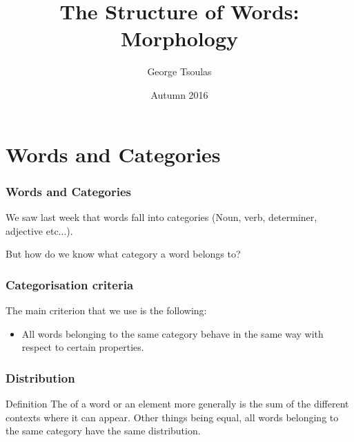


\title{The Structure of Words:  Morphology }
\date{Autumn 2016}
\author{George Tsoulas}


\maketitle
\section{Words and Categories}
\begin{frame}
  \frametitle{Words and Categories}

We saw last week that words fall into categories (Noun, verb, determiner, adjective etc...).

\pause

But how do we know what category a word belongs to?


\end{frame}

\begin{frame}
\frametitle{Categorisation criteria}
  The main criterion that we use is the following:

  \begin{itemize}
  \item All words belonging to the same category behave in the same way with respect to certain properties.
  \end{itemize}
\end{frame}


\begin{frame}
  \frametitle{Distribution}

\begin{block}{Definition}
The  of a word or an element more generally is the sum of the different contexts where it can appear.  Other things being equal, all words belonging to the same category have the same distribution. 
\end{block}
\end{frame}



